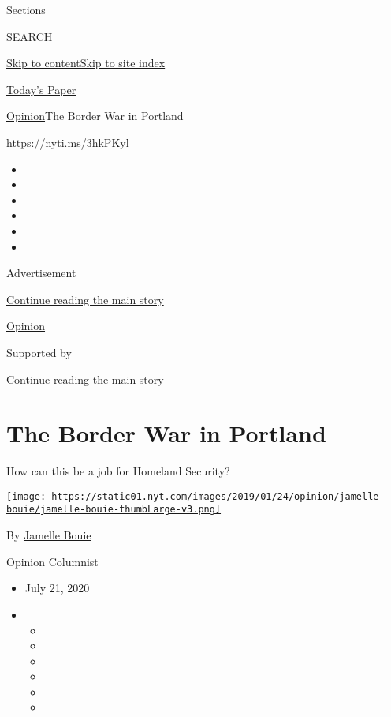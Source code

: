 Sections

SEARCH

\protect\hyperlink{site-content}{Skip to
content}\protect\hyperlink{site-index}{Skip to site index}

\href{https://myaccount.nytimes.com/auth/login?response_type=cookie\&client_id=vi}{}

\href{https://www.nytimes.com/section/todayspaper}{Today's Paper}

\href{/section/opinion}{Opinion}\textbar{}The Border War in Portland

\href{https://nyti.ms/3hkPKyl}{https://nyti.ms/3hkPKyl}

\begin{itemize}
\item
\item
\item
\item
\item
\item
\end{itemize}

Advertisement

\protect\hyperlink{after-top}{Continue reading the main story}

\href{/section/opinion}{Opinion}

Supported by

\protect\hyperlink{after-sponsor}{Continue reading the main story}

\hypertarget{the-border-war-in-portland}{%
\section{The Border War in Portland}\label{the-border-war-in-portland}}

How can this be a job for Homeland Security?

\href{https://www.nytimes.com/column/jamelle-bouie}{\texttt{[image: https://static01.nyt.com/images/2019/01/24/opinion/jamelle-bouie/jamelle-bouie-thumbLarge-v3.png]}}

By \href{https://www.nytimes.com/column/jamelle-bouie}{Jamelle Bouie}

Opinion Columnist

\begin{itemize}
\item
  July 21, 2020
\item
  \begin{itemize}
  \item
  \item
  \item
  \item
  \item
  \item
  \end{itemize}
\end{itemize}

